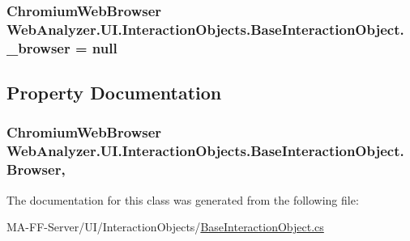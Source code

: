 \subsubsection[{\+\_\+browser}]{\setlength{\rightskip}{0pt plus 5cm}Chromium\+Web\+Browser Web\+Analyzer.\+U\+I.\+Interaction\+Objects.\+Base\+Interaction\+Object.\+\_\+browser = null\hspace{0.3cm}{\ttfamily [private]}}\label{class_web_analyzer_1_1_u_i_1_1_interaction_objects_1_1_base_interaction_object_aa56933a7ca14c6251019e27c6ec97813}


\subsection{Property Documentation}
\hypertarget{class_web_analyzer_1_1_u_i_1_1_interaction_objects_1_1_base_interaction_object_aac4f2f8441547dc677f700485c295259}{}
\subsubsection[{Browser}]{\setlength{\rightskip}{0pt plus 5cm}Chromium\+Web\+Browser Web\+Analyzer.\+U\+I.\+Interaction\+Objects.\+Base\+Interaction\+Object.\+Browser\hspace{0.3cm}{\ttfamily [get]}, {\ttfamily [set]}}\label{class_web_analyzer_1_1_u_i_1_1_interaction_objects_1_1_base_interaction_object_aac4f2f8441547dc677f700485c295259}


The documentation for this class was generated from the following file\+:\begin{DoxyCompactItemize}
\item 
M\+A-\/\+F\+F-\/\+Server/\+U\+I/\+Interaction\+Objects/\hyperlink{_base_interaction_object_8cs}{Base\+Interaction\+Object.\+cs}\end{DoxyCompactItemize}
